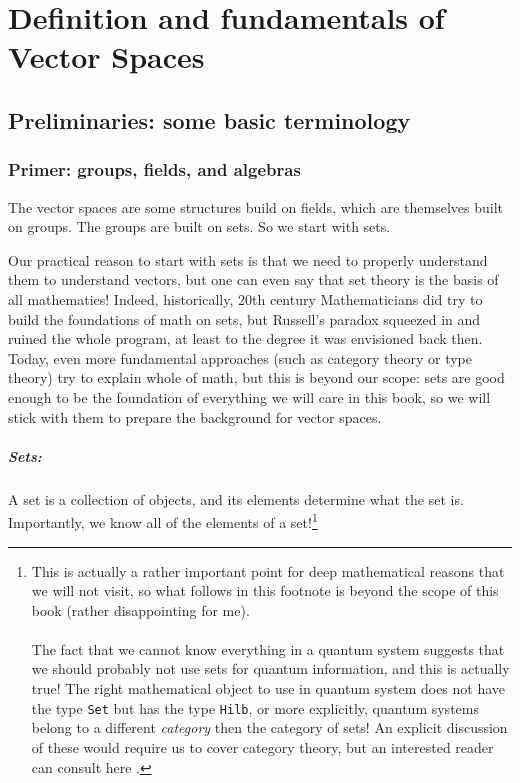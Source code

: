 \chapter{Definition and fundamentals of Vector Spaces}
\section{Preliminaries: some basic terminology}
\subsection{Primer: groups, fields, and algebras}
The vector spaces are some structures build on fields, which are themselves built on groups. The groups are built on sets. So we start with sets.

Our practical reason to start with sets is that we need to properly understand them to understand vectors, but one can even say that set theory is the basis of all mathematics! Indeed, historically, 20th century Mathematicians did try to build the foundations of math on sets, but Russell's paradox squeezed in and ruined the whole program, at least to the degree it was envisioned back then. Today, even more fundamental approaches (such as category theory or type theory) try to explain whole of math, but this is beyond our scope: sets are good enough to be the foundation of everything we will care in this book, so we will stick with them to prepare the background for vector spaces.

\paragraph{Sets:} A set is a collection of objects, and its elements determine what the set is. Importantly, we know all of the elements of a set!\footnote{This is actually a rather important point for deep mathematical reasons that we will not visit, so what follows in this footnote is beyond the scope of this book (rather disappointing for me).\\\\ The fact that we cannot know everything in a quantum system suggests that we should probably not use sets for quantum information, and this is actually true! The right mathematical object to use in quantum system does not have the type \texttt{Set} but has the type \texttt{Hilb}, or more explicitly, quantum systems belong to a different \emph{category} then the category of sets! An explicit discussion of these would require us to cover category theory, but an interested reader can consult here .}


